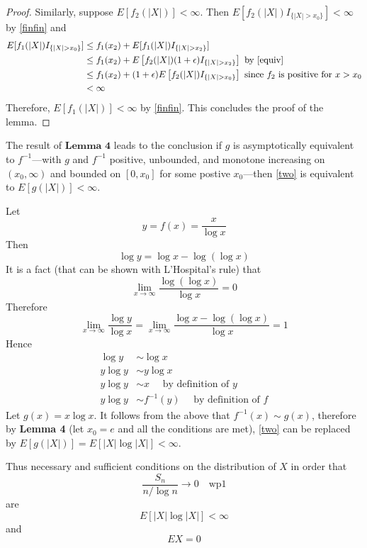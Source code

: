 \documentclass[letterpaper, 12pt]{article}
\begin{document}
\begin{proof}
Similarly, suppose $E[f_2(|X|)] < \infty$. Then $E[f_2(|X|)I_{\{|X| > x_0\}}] < \infty$ by \eqref{finfin} and 
\begin{align*}
E[f_1(|X|)I_{\{|X| > x_0\}}]
&\leq
f_1(x_2) + E[f_1(|X|)I_{\{|X| > x_2\}}]
\\
&\leq
f_1(x_2) + E\left[f_2(|X|)(1+\epsilon)I_{\{|X| > x_2\}}\right]
\text{ by \eqref{equiv}}
\\
&\leq
f_1(x_2) + 
(1+\epsilon)
E\left[f_2(|X|)I_{\{|X| > x_0\}}\right]
\text{ since $f_2$ is positive for $x>x_0$}
\\
&< \infty
\end{align*}
Therefore, $E[f_1(|X|)] < \infty$ by \eqref{finfin}. This concludes the proof of the lemma.
\end{proof}

The result of $\textbf{Lemma 4}$ leads to the conclusion if $g$ is asymptotically equivalent to $f^{-1}$---with $g$ and $f^{-1}$ positive, unbounded, and monotone increasing on $(x_0, \infty)$ and bounded on $[0, x_0]$ for some postive $x_0$---then \eqref{two} is equivalent to $E[g(|X|)] < \infty$.

Let
\[
y = f(x) = \frac{x}{\log x}
\]
Then 
\[
\log y = \log x - \log (\log x)
\]
It is a fact (that can be shown with L'Hospital's rule) that
\[
\lim_{x\to\infty} \frac{\log (\log x)}{\log x} = 0
\]
Therefore
\[
\lim_{x\to\infty}\frac{\log y}{\log x} = 
\lim_{x\to\infty}\frac{\log x - \log(\log x)}{\log x} 
=
1
\]
Hence 
\begin{align*}
\log y 
&\sim \log x
\\
y \log y
&\sim y \log x
\\
y \log y
&\sim x \quad \text{ by definition of $y$}
\\
y \log y
&\sim f^{-1}(y) \quad \text{ by definition of $f$}
\end{align*}
Let $g(x) = x \log x$. It follows from the above that $f^{-1}(x) \sim g(x)$, therefore by \textbf{Lemma 4} (let $x_0 = e$ and all the conditions are met), \eqref{two} can be replaced by $E[g(|X|)] = E[|X|\log |X|] < \infty$.

Thus necessary and sufficient conditions on the distribution of $X$ in order that
\[
\frac{S_n}{n / \log n} \to 0 \quad\text{wp1}
\]
are 
\[
E[|X| \log |X|] < \infty
\]
and 
\[
EX = 0
\]
\end{document}
